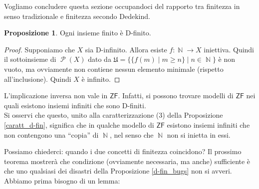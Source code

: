 \documentclass[12pt,a4paper]{report}
\theoremstyle{definition}
\newtheorem{prop}[teo]{Proposizione}  %
\theoremstyle{num.custom-title}
\DeclareMathOperator{\U}{\mathcal{U}}
\DeclareMathOperator{\PP}{\mathcal{P}}
\DeclareMathOperator{\N}{\mathbb{N}}
\newcommand{\AC}{\ensuremath{\mathsf{AC}}\xspace}
\newcommand{\ZF}{\ensuremath{\mathsf{ZF}}\xspace}
\renewcommand{\U}{\mathfrak{U}}
\begin{document}
Vogliamo concludere questa sezione occupandoci del rapporto tra finitezza in senso tradizionale e finitezza secondo Dedekind.

\begin{prop}\label{fin_imp_d-fin}
Ogni insieme finito è D-finito.
\begin{proof}
Supponiamo che $X$ sia D-infinito. Allora esiste $f: \N \to X$ iniettiva. Quindi il sottoinsieme di $\PP(X)$ dato da $\U=\{\{f(m) \mid m \geq n\} \mid n \in \N\}$ è non vuoto, ma ovviamente non contiene nessun elemento minimale (rispetto all'inclusione). Quindi $X$ è infinito.
\end{proof}
\end{prop}

L'implicazione inversa non vale in \ZF. Infatti, si possono trovare modelli di \ZF nei quali esistono insiemi infiniti che sono D-finiti.\\
Si osservi che questo, unito alla caratterizzazione (3) della Proposizione \ref{caratt_d-fin}, significa che in qualche modello di \ZF esistono insiemi infiniti che non contengono una ``copia'' di $\N$, nel senso che $\N$ non si inietta in essi. 


Possiamo chiederci: quando i due concetti di finitezza coincidono? Il prossimo teorema mostrerà che condizione (ovviamente necessaria, ma anche) sufficiente è che uno qualsiasi dei disastri della Proposizione \ref{d-fin_bugs} non si avveri. Abbiamo prima bisogno di un lemma:
\end{document}
